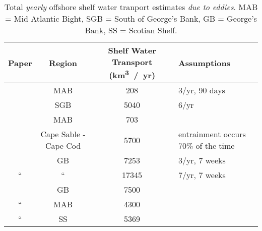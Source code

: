 \begin{landscape}
\linespread{1}

\begin{table}[h]
	\centering
	\begin{tabular}{ccSp{1.5in}}
		\toprule
 	Paper 		& Region & {{Shelf Water Transport (\si{\km^3 /yr})}} & Assumptions\\ \midrule
\cite{Morgan1977} & MAB	& 	208	& 3/yr, 90 days	\\ 
\cite{Smith1978a} & SGB 	& 	5040 & 6/yr	\\
\cite{Bisagni1983}& MAB 	& 703	& 	\\
\cite{Garfield1987} & Cape Sable - Cape Cod & 5700 & entrainment occurs 70\% of the time \\
\cite{Flagg1987} 	& GB 	& 7253 & 3/yr, 7 weeks \\
		“		&  “	    & 17345  & 7/yr, 7 weeks \\
\cite{Chaudhuri2009} & GB	& 7500 & \\
“				  & MAB	& 4300 & \\
“ 				 & SS 	& 5369 & \\ 
 		\bottomrule
	\end{tabular}
	\caption{Total \emph{yearly} offshore shelf water tranport estimates \emph{due to eddies}. MAB = Mid Atlantic Bight, SGB = South of George’s Bank, GB = George’s Bank, SS = Scotian Shelf.}
	\label{tab:offtrans} 
\end{table}
	

\end{landscape}
